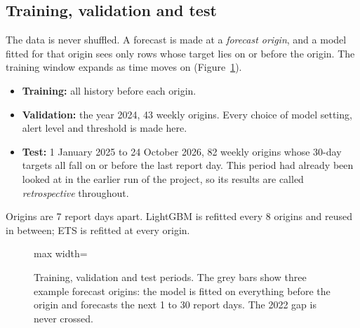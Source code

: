 \subsection{Training, validation and test}\label{sec:splits}
The data is never shuffled. A forecast is made at a \emph{forecast origin}, and a model fitted for that origin sees only rows whose target lies on or before the origin. The training window expands as time moves on (Figure~\ref{fig:splits}).
\begin{itemize}[leftmargin=*,itemsep=2pt]
\item \textbf{Training:} all history before each origin.
\item \textbf{Validation:} the year 2024, 43 weekly origins. Every choice of model setting, alert level and threshold is made here.
\item \textbf{Test:} 1 January 2025 to 24 October 2026, 82 weekly origins whose 30-day targets all fall on or before the last report day. This period had already been looked at in the earlier run of the project, so its results are called \emph{retrospective} throughout.
\end{itemize}
Origins are 7 report days apart. LightGBM is refitted every 8 origins and reused in between; ETS is refitted at every origin.

\begin{figure}[H]
\centering
\begin{adjustbox}{max width=\linewidth}\end{adjustbox}
\caption[Training, validation and test periods]{Training, validation and test periods. The grey bars show three example forecast origins: the model is fitted on everything before the origin and forecasts the next 1 to 30 report days. The 2022 gap is never crossed.}
\label{fig:splits}
\end{figure}

